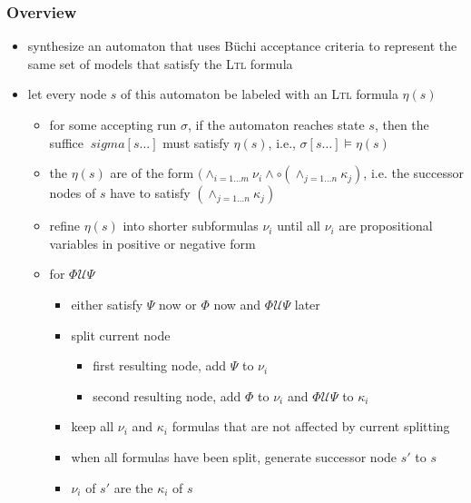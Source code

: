 \documentclass[a4paper, 10pt]{article}
\begin{document}
\subsubsection*{Overview}
\begin{itemize}
    \item synthesize an automaton that uses Büchi acceptance criteria to represent the same set of models that satisfy the \textsc{Ltl} formula
    \item let every node $s$ of this automaton be labeled with an \textsc{Ltl} formula $\eta(s)$
    \begin{itemize}
        \item for some accepting run $\sigma$, if the automaton reaches state $s$, then the suffice $\ sigma[s\dots]$ must satisfy $\eta(s)$, i.e., $\sigma[s\dots]\models\eta(s)$
        \item the $\eta(s)$ are of the form $(\wedge_{i=1\dots m}\nu_i\wedge\circ(\wedge_{j=1\dots n} \kappa_j)$, i.e. the successor nodes of $s$ have to satisfy $(\wedge_{j=1\dots n}\kappa_j)$
        \item refine $\eta(s)$ into shorter subformulas $\nu_i$ until all $\nu_i$ are propositional variables in positive or negative form
    \end{itemize}
    \begin{center}
    \scalebox{.8}{}
    \end{center}
    \begin{itemize}
        \item for $\Phi \mathcal{U} \Psi$
        \begin{itemize}
            \item either satisfy $\Psi$ now or $\Phi$ now and $\Phi \mathcal{U} \Psi$ later
            \item split current node
            \begin{itemize}
                \item first resulting node, add $\Psi$ to $\nu_i$
                \item second resulting node, add $\Phi$ to $\nu_i$ and $\Phi \mathcal{U} \Psi$ to $\kappa_i$
            \end{itemize}
            \item keep all $\nu_i$ and $\kappa_i$ formulas that are not affected by current splitting
            \item when all formulas have been split, generate successor node $s'$ to $s$
            \item $\nu_i$ of $s'$ are the $\kappa_i$ of $s$

\end{itemize}
\end{itemize}
\end{itemize}
\end{document}

